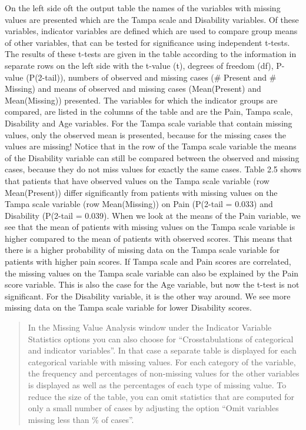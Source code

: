 \documentclass[]{book}
\begin{document}
On the left side oft the output table the names of the variables with
missing values are presented which are the Tampa scale and Disability
variables. Of these variables, indicator variables are defined which are
used to compare group means of other variables, that can be tested for
significance using independent t-tests. The results of these t-tests are
given in the table according to the information in separate rows on the
left side with the t-value (t), degrees of freedom (df), P-value
(P(2-tail)), numbers of observed and missing cases (\# Present and \#
Missing) and means of observed and missing cases (Mean(Present) and
Mean(Missing)) presented. The variables for which the indicator groups
are compared, are listed in the columns of the table and are the Pain,
Tampa scale, Disability and Age variables. For the Tampa scale variable
that contain missing values, only the observed mean is presented,
because for the missing cases the values are missing! Notice that in the
row of the Tampa scale variable the means of the Disability variable can
still be compared between the observed and missing cases, because they
do not miss values for exactly the same cases. Table 2.5 shows that
patients that have observed values on the Tampa scale variable (row
Mean(Present)) differ significantly from patients with missing values on
the Tampa scale variable (row Mean(Missing)) on Pain (P(2-tail = 0.033)
and Disability (P(2-tail = 0.039). When we look at the means of the Pain
variable, we see that the mean of patients with missing values on the
Tampa scale variable is higher compared to the mean of patients with
observed scores. This means that there is a higher probability of
missing data on the Tampa scale variable for patients with higher pain
scores. If Tampa scale and Pain scores are correlated, the missing
values on the Tampa scale variable can also be explained by the Pain
score variable. This is also the case for the Age variable, but now the
t-test is not significant. For the Disability variable, it is the other
way around. We see more missing data on the Tampa scale variable for
lower Disability scores.

\begin{quote}
In the Missing Value Analysis window under the Indicator Variable
Statistics options you can also choose for ``Crosstabulations of
categorical and indicator variables''. In that case a separate table is
displayed for each categorical variable with missing values. For each
category of the variable, the frequency and percentages of non-missing
values for the other variables is displayed as well as the percentages
of each type of missing value. To reduce the size of the table, you can
omit statistics that are computed for only a small number of cases by
adjusting the option ``Omit variables missing less than \% of cases''.
\end{quote}
\end{document}
